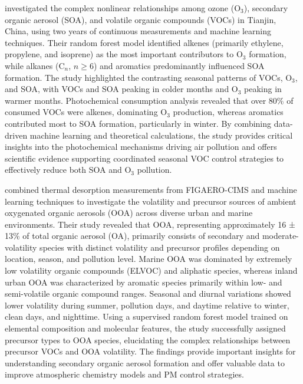 \documentclass[11pt]{article}
\begin{document}
\citet{wang2022machine} investigated the complex nonlinear relationships among ozone (O$_3$), secondary organic aerosol (SOA), and volatile organic compounds (VOCs) in Tianjin, China, using two years of continuous measurements and machine learning techniques. Their random forest model identified alkenes (primarily ethylene, propylene, and isoprene) as the most important contributors to O$_3$ formation, while alkanes (C$_n$, \( n \geq 6 \)) and aromatics predominantly influenced SOA formation. The study highlighted the contrasting seasonal patterns of VOCs, O$_3$, and SOA, with VOCs and SOA peaking in colder months and O$_3$ peaking in warmer months. Photochemical consumption analysis revealed that over 80\% of consumed VOCs were alkenes, dominating O$_3$ production, whereas aromatics contributed most to SOA formation, particularly in winter. By combining data-driven machine learning and theoretical calculations, the study provides critical insights into the photochemical mechanisms driving air pollution and offers scientific evidence supporting coordinated seasonal VOC control strategies to effectively reduce both SOA and O$_3$ pollution.

\citet{wang2024linking} combined thermal desorption measurements from FIGAERO-CIMS and machine learning techniques to investigate the volatility and precursor sources of ambient oxygenated organic aerosols (OOA) across diverse urban and marine environments. Their study revealed that OOA, representing approximately 16 ± 13\% of total organic aerosol (OA), primarily consists of secondary and moderate-volatility species with distinct volatility and precursor profiles depending on location, season, and pollution level. Marine OOA was dominated by extremely low volatility organic compounds (ELVOC) and aliphatic species, whereas inland urban OOA was characterized by aromatic species primarily within low- and semi-volatile organic compound ranges. Seasonal and diurnal variations showed lower volatility during summer, pollution days, and daytime relative to winter, clean days, and nighttime. Using a supervised random forest model trained on elemental composition and molecular features, the study successfully assigned precursor types to OOA species, elucidating the complex relationships between precursor VOCs and OOA volatility. The findings provide important insights for understanding secondary organic aerosol formation and offer valuable data to improve atmospheric chemistry models and PM control strategies.
\end{document}
